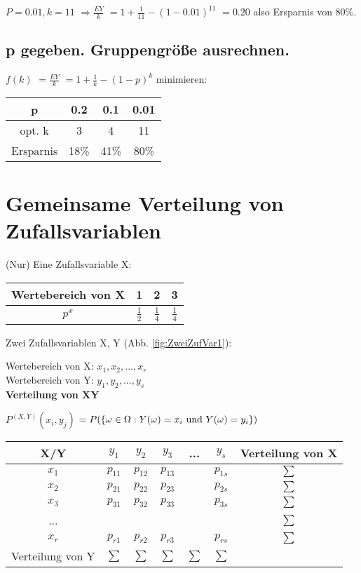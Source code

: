$P=0.01, k=11$
$\Rightarrow \frac{EY}{k}$
$=1 + \frac{1}{11} - (1 - 0.01)^{11}$
$=0.20$ also Ersparnis von 80\%.

\subsection{p gegeben. Gruppengröße ausrechnen.}
$f(k)$
$= \frac{EY}{k}$
$= 1 + \frac{1}{k} - (1-p)^k$ minimieren: \\

\begin{tabular}{|c|c|c|c|}
\hline p & 0.2 & 0.1 & 0.01 \\ 
\hline opt. k & 3 & 4 & 11 \\ 
\hline Ersparnis & 18\% & 41\% & 80\% \\ 
\hline 
\end{tabular} 

\section{Gemeinsame Verteilung von Zufallsvariablen}
(Nur) Eine Zufallsvariable X:
\begin{tabular}{|c|c|c|c|}
\hline Wertebereich von X & 1 & 2 & 3 \\ 
\hline $p^x$ & $\frac 1 2$ & $\frac 1 4$ & $\frac 1 4$ \\ 
\hline 
\end{tabular} 


Zwei Zufallsvariablen X, Y (Abb. \ref{fig:ZweiZufVar1}): 

Wertebereich von X: $x_1, x_2, ..., x_r$\\
Wertebereich von Y: $y_1, y_2, ..., y_s$\\

\textbf{Verteilung von XY} 

$P^{(X,Y)}(x_i,y_j) $
$=P( \left\lbrace \omega \in \Omega : Y(\omega) = x_i \textrm{ und } Y(\omega) = y_i \right\rbrace )$

\begin{tabular}{|c|c|c|c|c|c|c|}
\hline X/Y & $y_1$ & $y_2$ & $y_3$ & ... & $y_s$ & Verteilung von X\\ 
\hline $x_1$ & $p_{11}$ & $p_{12}$ & $p_{13}$ &  & $p_{1s}$ & $\sum$ \\ 
\hline $x_2$ & $p_{21}$ & $p_{22}$ & $p_{23}$ &  & $p_{2s}$ & $\sum$ \\ 
\hline $x_3$ & $p_{31}$ & $p_{32}$ & $p_{33}$ &  & $p_{3s}$ & $\sum$ \\ 
\hline ... &  &  &  &  &  & $\sum$ \\ 
\hline $x_r$ & $p_{r1}$ & $p_{r2}$ & $p_{r3}$ &  & $p_{rs}$ & $\sum$ \\ 
\hline Verteilung von Y & $\sum$  & $\sum$  & $\sum$  & $\sum$  & $\sum$  &  \\
\hline 
\end{tabular} 
